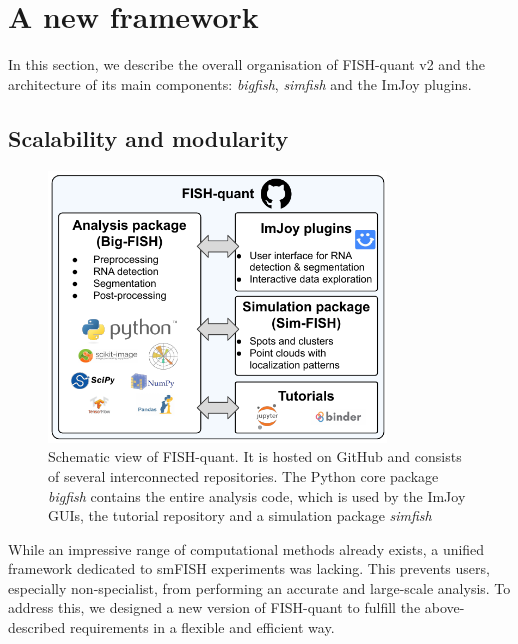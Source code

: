 
\section{A new framework}
\label{sec:fqv2}

In this section, we describe the overall organisation of FISH-quant v2 and the architecture of its main components: \emph{bigfish}, \emph{simfish} and the ImJoy plugins.

\subsection{Scalability and modularity}
\label{subsec:framework}

\begin{figure}[h]
    \centering
    \includegraphics[width=0.8\textwidth]{figures/chapter1/schema_fishquant}
    \caption{Schematic view of FISH-quant.
	It is hosted on GitHub and consists of several interconnected repositories.
	The Python core package \emph{bigfish} contains the entire analysis code, which is used by the ImJoy GUIs, the tutorial repository and a simulation package \emph{simfish}}
    \label{fig:fishquant}
\end{figure}

While an impressive range of computational methods already exists, a unified framework dedicated to \ac{smFISH} experiments was lacking.
This prevents users, especially non-specialist, from performing an accurate and large-scale analysis.
To address this, we designed a new version of FISH-quant to fulfill the above-described requirements in a flexible and efficient way.


